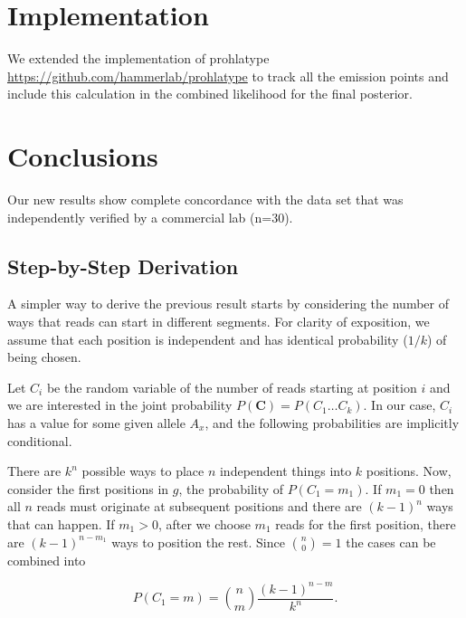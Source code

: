 \section{Implementation}

We extended the implementation of prohlatype 
\url{https://github.com/hammerlab/prohlatype}
to track all the emission points and
include this calculation in the combined likelihood
for the final posterior.

\section{Conclusions}

Our new results show complete concordance with the data set that was
independently verified by a commercial lab (n=30).

\clearpage




\clearpage

\appendix

\subsection{Step-by-Step Derivation}

A simpler way to derive the previous result starts by considering the number
of ways that reads can start in different segments.
For clarity of exposition,
we assume that each position is independent
and has identical probability ($1/k$) of being chosen.

Let $C_{i}$ be the random variable of the number of reads starting at position
$i$ 
and we are interested in the joint probability $P(\mathbf{C})=P(C_{1} \ldots C_{k})$.
In our case, $C_{i}$ has a value for some given allele $A_{x}$,
and the following probabilities are implicitly conditional.

There are $k^{n}$ possible ways to place $n$ independent things into $k$ positions.
Now, consider the first positions in $g$, the probability of $P(C_{1} = m_{1})$.
If $m_{1}=0$ then all $n$ reads must originate at subsequent positions and there
are $(k-1)^{n}$ ways that can happen.
If $m_{1} > 0$, after we choose $m_{1}$ reads for the first position,
there are $(k-1)^{n-m_{1}}$ ways to position the rest.
Since ${n \choose 0} = 1$ the cases can be combined into

\begin{equation}
  P(C_{1} = m) ={n \choose m}\frac{(k-1)^{n-m}}{k^{n}}. \nonumber
\end{equation}

